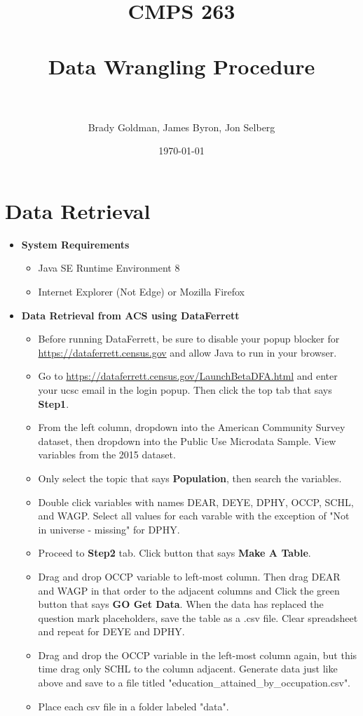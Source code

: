 \documentclass[paper=a4, fontsize=11pt]{scrartcl} %
\title{	
\normalfont \normalsize 
\textsc{CMPS 263} \\ [25pt] %
\horrule{0.5pt} \\[0.4cm] %
\huge Data Wrangling Procedure \\ %
\horrule{2pt} \\[0.5cm] %
}
\author{Brady Goldman, James Byron, Jon Selberg} %
\date{\normalsize\today} %
\numberwithin{equation}{section} %
\numberwithin{figure}{section} %
\numberwithin{table}{section} %
\begin{document}
\maketitle %

\section{Data Retrieval}

\begin{itemize}
	\item \textbf{System Requirements}
	\begin{itemize}
		\item Java SE Runtime Environment 8
		\item Internet Explorer (Not Edge) or Mozilla Firefox
	\end{itemize}
	\item \textbf{Data Retrieval from ACS using DataFerrett}
	\begin{itemize}
			\item Before running DataFerrett, be sure to disable your popup blocker for  \url{https://dataferrett.census.gov} and allow Java to run in your browser.
			\item Go to \url{https://dataferrett.census.gov/LaunchBetaDFA.html} and enter your ucsc email in the login popup.  Then click the top tab that says \textbf{Step1}.
			\item From the left column, dropdown into the American Community Survey dataset, then dropdown into the Public Use Microdata Sample.  View variables from the 2015 dataset.
			\item Only select the topic that says \textbf{Population}, then search the variables.
			\item Double click variables with names DEAR, DEYE, DPHY, OCCP, SCHL, and WAGP.  Select all values for each varable with the exception of "Not in universe - missing" for DPHY.
			\item Proceed to \textbf{Step2} tab.  Click button that says \textbf{Make A Table}.
			\item Drag and drop OCCP variable to left-most column.  Then drag DEAR and WAGP in that order to the adjacent columns and Click the green button that says \textbf{GO Get Data}.  When the data has replaced the question mark placeholders, save the table as a .csv file.  Clear spreadsheet and repeat for DEYE and DPHY.
			\item Drag and drop the OCCP variable in the left-most column again, but this time drag only SCHL to the column adjacent.  Generate data just like above and save to a file titled "education\_attained\_by\_occupation.csv".
			\item Place each csv file in a folder labeled "data".
	\end{itemize}
\end{itemize}
\end{document}
